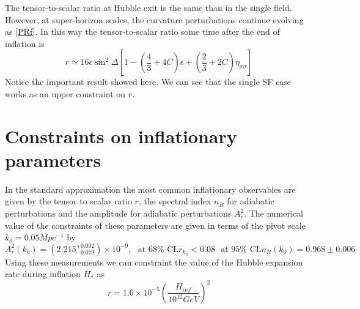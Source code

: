 \documentclass[amssymb,twocolumn,prd,nofootinbib,showpacs]{revtex4-1}
\begin{document}
The tensor-to-scalar ratio at Hubble exit is the same than in the single field. However, at super-horizon scales, the curvature perturbations continue evolving as \eqref{PRf}. In this way the tensor-to-scalar ratio some time after the end of inflation is
\begin{equation}\label{Tensortoscalar}
r\simeq 16\epsilon \sin^2\Delta\left[1-\left(\frac{4}{3}+4C\right)\epsilon +\left(\frac{2}{3}+2C\right)\eta_{\sigma\sigma}\right]
\end{equation}
Notice the important result showed here. We can see that the single SF case works as an upper constraint on $r$.
\section{Constraints on inflationary parameters}\label{experimentos}

In the standard approximation the most common inflationary observables are given by the tensor to scalar ratio $r$, the spectral index $n_R$ for adiabatic perturbations and the amplitude for adiabatic perturbations $A_r^2$.  The numerical value of the constraints of these parameters are given in terms of the pivot scale $k_0=0.05 Mpc^{-1}$ by \cite{const1,const2,planck,const3,const4,const5}
\begin{subequations}
\begin{equation}\label{amplitude}
A_r^2(k_0)=(2.215^{+0.032}_{-0.079})\times 10^{-9}, \ \ \ \text{at $68\%$ CL}
\end{equation}
\begin{equation}
r_{k_0}<0.08 \ \ \ \text{at $95\%$ CL}
\end{equation}
\begin{equation}\label{n_R}
n_R(k_0)=0.968 \pm 0.006
\end{equation}
\end{subequations}
Using these measurements we can constraint the value of the Hubble expansion rate during inflation $H_*$ as \cite{H1,H2}
\begin{equation}\label{Hinf}
r = 1.6\times 10^{-5}\left(\frac{H_{inf}}{10^{12}GeV}\right)^2
\end{equation}
\end{document}

